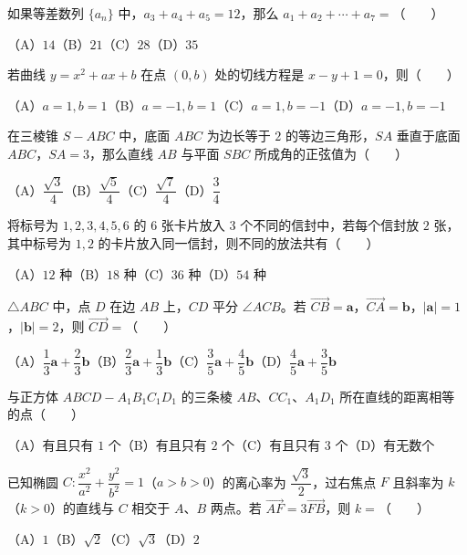 \begin{question}
如果等差数列 $\{a_n\}$ 中，$a_3+a_4+a_5=12$，那么 $a_1+a_2+\cdots+a_7=$\mbox{（　　）}

（A）$14$\quad（B）$21$\quad（C）$28$\quad（D）$35$

\end{question}
\begin{question}
若曲线 $y=x^2+ax+b$ 在点 $(0,b)$ 处的切线方程是 $x-y+1=0$，则\mbox{（　　）}

（A）$a=1,b=1$\quad（B）$a=-1,b=1$\quad（C）$a=1,b=-1$\quad（D）$a=-1,b=-1$

\end{question}
\begin{question}
在三棱锥 $S-ABC$ 中，底面 $ABC$ 为边长等于 $2$ 的等边三角形，$SA$ 垂直于底面 $ABC$，$SA=3$，那么直线 $AB$ 与平面 $SBC$ 所成角的正弦值为\mbox{（　　）}

（A）$\dfrac{\sqrt3}{4}$\quad（B）$\dfrac{\sqrt5}{4}$\quad（C）$\dfrac{\sqrt7}{4}$\quad（D）$\dfrac34$

\end{question}
\begin{question}
将标号为 $1,2,3,4,5,6$ 的 $6$ 张卡片放入 $3$ 个不同的信封中，若每个信封放 $2$ 张，其中标号为 $1,2$ 的卡片放入同一信封，则不同的放法共有\mbox{（　　）}

（A）$12$ 种\quad（B）$18$ 种\quad（C）$36$ 种\quad（D）$54$ 种

\end{question}
\begin{question}
$\triangle ABC$ 中，点 $D$ 在边 $AB$ 上，$CD$ 平分 $\angle ACB$。若 $\overrightarrow{CB}=\boldsymbol a$，$\overrightarrow{CA}=\boldsymbol b$，$|\boldsymbol a|=1$，$|\boldsymbol b|=2$，则 $\overrightarrow{CD}=$\mbox{（　　）}

（A）$\dfrac13\boldsymbol a+\dfrac23\boldsymbol b$\quad（B）$\dfrac23\boldsymbol a+\dfrac13\boldsymbol b$\quad（C）$\dfrac35\boldsymbol a+\dfrac45\boldsymbol b$\quad（D）$\dfrac45\boldsymbol a+\dfrac35\boldsymbol b$

\end{question}
\begin{question}
与正方体 $ABCD-A_1B_1C_1D_1$ 的三条棱 $AB\text{、}CC_1\text{、}A_1D_1$ 所在直线的距离相等的点\mbox{（　　）}

（A）有且只有 $1$ 个\quad（B）有且只有 $2$ 个\quad（C）有且只有 $3$ 个\quad（D）有无数个

\end{question}
\begin{question}
已知椭圆 $C:\dfrac{x^2}{a^2}+\dfrac{y^2}{b^2}=1$（$a>b>0$）的离心率为 $\dfrac{\sqrt3}{2}$，过右焦点 $F$ 且斜率为 $k$（$k>0$）的直线与 $C$ 相交于 $A\text{、}B$ 两点。若 $\overrightarrow{AF}=3\overrightarrow{FB}$，则 $k=$\mbox{（　　）}

（A）$1$\quad（B）$\sqrt2$\quad（C）$\sqrt3$\quad（D）$2$

\end{question}


